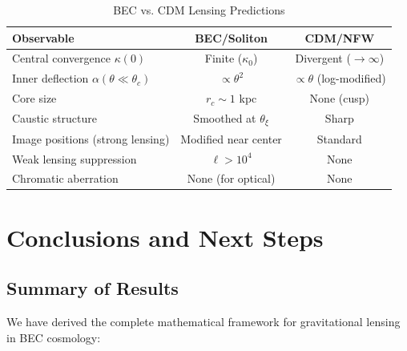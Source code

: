 \documentclass[11pt,a4paper]{article}
\theoremstyle{definition}
\theoremstyle{remark}
\begin{document}
\begin{table}[H]
\centering
\caption{BEC vs. CDM Lensing Predictions}
\label{tab:predictions}
\begin{tabular}{@{}p{4cm}cc@{}}
\toprule
\textbf{Observable} & \textbf{BEC/Soliton} & \textbf{CDM/NFW} \\
\midrule
Central convergence $\kappa(0)$ & Finite ($\kappa_0$) & Divergent ($\to \infty$) \\
Inner deflection $\alpha(\theta \ll \theta_c)$ & $\propto \theta^2$ & $\propto \theta$ (log-modified) \\
Core size & $r_c \sim 1$ kpc & None (cusp) \\
Caustic structure & Smoothed at $\theta_\xi$ & Sharp \\
Image positions (strong lensing) & Modified near center & Standard \\
Weak lensing suppression & $\ell > 10^4$ & None \\
Chromatic aberration & None (for optical) & None \\
\bottomrule
\end{tabular}
\end{table}

\section{Conclusions and Next Steps}
\label{sec:conclusions}

\subsection{Summary of Results}

We have derived the complete mathematical framework for gravitational lensing in BEC cosmology:
\end{document}

